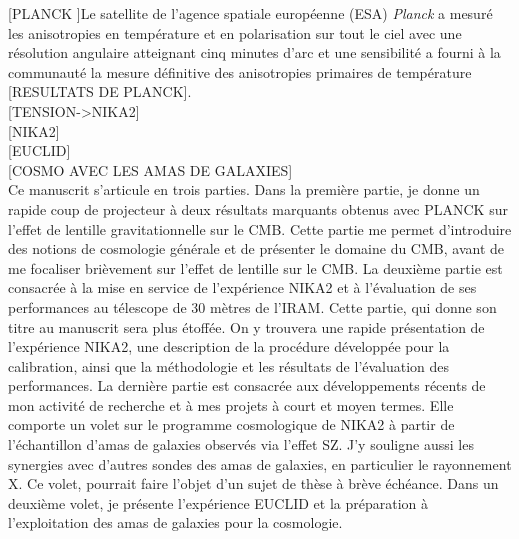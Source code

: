 [PLANCK ]Le satellite de l'agence spatiale européenne (ESA) \emph{Planck} a
mesuré les anisotropies en température et en polarisation sur tout le
ciel avec une résolution angulaire atteignant cinq minutes d'arc et
une sensibilité  
a
fourni à la communauté la mesure définitive des anisotropies primaires
de température  
[RESULTATS DE PLANCK]. \\

[TENSION->NIKA2]\\


[NIKA2] \\


[EUCLID]  \\

[COSMO AVEC LES AMAS DE GALAXIES] \\



Ce manuscrit s'articule en trois parties. Dans la première partie, je
donne un rapide coup de projecteur à deux résultats marquants obtenus
avec PLANCK sur l'effet de lentille gravitationnelle sur le CMB. Cette
partie me permet d'introduire des notions de cosmologie générale et de
présenter le domaine du CMB, avant de me focaliser brièvement sur l'effet de
lentille sur le CMB. La deuxième partie est consacrée à la mise en
service de l'expérience NIKA2 et à l'évaluation de ses performances au
télescope de 30 mètres de l'IRAM. Cette partie, qui donne son titre au
manuscrit sera plus étoffée. On y trouvera une rapide présentation de
l'expérience NIKA2, une description de la procédure développée pour la
calibration, ainsi que la méthodologie et les résultats de
l'évaluation des performances. La dernière partie est consacrée aux
développements récents de mon activité de recherche et à mes projets à
court et moyen termes. Elle comporte un volet sur
le programme cosmologique de NIKA2 à partir de l'échantillon d'amas de
galaxies observés via l'effet SZ. J'y souligne aussi les synergies
avec d'autres sondes des amas de galaxies, en particulier le
rayonnement X. Ce volet, pourrait faire l'objet d'un sujet de thèse à
brève échéance. Dans un deuxième volet, je présente l'expérience
EUCLID et la préparation à l'exploitation des amas de galaxies
pour la cosmologie. 


